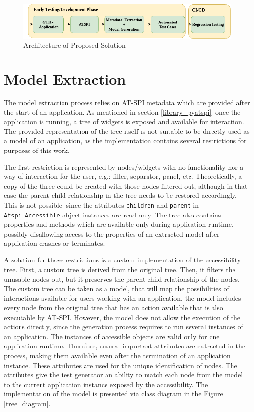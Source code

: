 \begin{figure}[hbt]
	\centering
	\includegraphics[width=1\textwidth]{obrazky-figures/diagram.png}
	\caption{Architecture of Proposed Solution}
	\label{Diagram}
\end{figure}

\section{Model Extraction}
The model extraction process relies on AT-SPI metadata which are provided after the start of an application. As mentioned in section \ref{library_pyatspi}, once the application is running, a tree of widgets is exposed and available for interaction. The provided representation of the tree itself is not suitable to be directly used as a model of an application, as the implementation contains several restrictions for purposes of this work.

The first restriction is represented by nodes/widgets with no functionality nor a way of interaction for the user, e.g.: filler, separator, panel, etc. Theoretically, a copy of the three could be created with those nodes filtered out, although in that case the parent-child relationship in the tree needs to be restored accordingly. This is not possible, since the attributes \texttt{children} and \texttt{parent} in \texttt{Atspi.Accessible} object instances are read-only. The tree also contains properties and methods which are available only during application runtime, possibly disallowing access to the properties of an extracted model after application crashes or terminates. 

A solution for those restrictions is a custom implementation of the accessibility tree. First, a custom tree is derived from the original tree. Then, it filters the unusable nodes out, but it preserves the parent-child relationship of the nodes. The custom tree can be taken as a model, that will map the possibilities of interactions available for users working with an application. the model includes every node from the original tree that has an action available that is also executable by AT-SPI. However, the model does not allow the execution of the actions directly, since the generation process requires to run several instances of an application. The instances of accessible objects are valid only for one application runtime. Therefore, several important attributes are extracted in the process, making them available even after the termination of an application instance. These attributes are used for the unique identification of nodes. The attributes give the test generator an ability to match each node from the model to the current application instance exposed by the accessibility. The implementation of the model is presented via class diagram in the Figure \ref{tree_diagram}.

